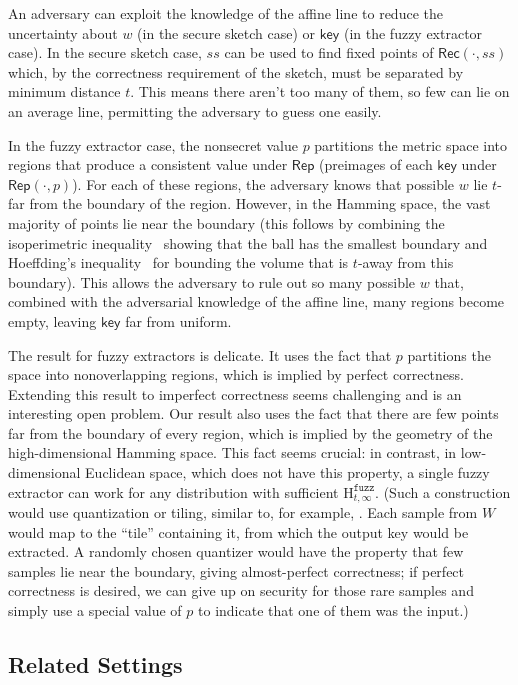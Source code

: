 \documentclass[11pt]{article}
\newcommand{\class}[1]{{\ensuremath{\mathsf{#1}}}}
\newcommand{\key}{\ensuremath{\class{key}}\xspace}
\newcommand{\rep}{\ensuremath{\class{Rep}}\xspace}
\newcommand{\rec}{\ensuremath{\class{Rec}}\xspace}
\newcommand{\Hfuzz}{\mathrm{H}^{\mathtt{fuzz}}_{t,\infty}}
\begin{document}
An adversary can exploit the knowledge of the affine line to reduce the uncertainty about $w$ (in the secure sketch case) or $\key$ (in the fuzzy extractor case). 
In the secure sketch case, $ss$ can be used to find fixed points of $\rec(\cdot, ss)$ which, by the correctness requirement of the sketch, must be separated by minimum distance $t$. This means there aren't too many of them, so few can lie on an average line, permitting the adversary to guess one easily.

In the fuzzy extractor case, the nonsecret value $p$ partitions the metric space into regions that produce a consistent value under $\rep$ (preimages of each $\key$ under $\rep(\cdot, p)$).  For each of these regions, the adversary knows that possible $w$ lie $t$-far from the boundary of the region.  However, in the Hamming space, the vast majority of points lie near the boundary (this follows by combining the isoperimetric inequality~\cite{harper1966optimal} showing that the ball has the smallest boundary and Hoeffding's inequality~\cite{hoeffding1963probability} for bounding the volume that is $t$-away from this boundary).  This allows the adversary to rule out so many possible $w$ that, combined with the adversarial knowledge of the affine line, many regions become empty, leaving $\key$ far from uniform.

The result for fuzzy extractors is delicate.  It uses the fact that $p$ partitions the space into nonoverlapping regions, which is implied by perfect correctness.  Extending this result to imperfect correctness seems challenging and is an interesting open problem. Our result also uses the fact that there are few points far from the boundary of every region, which is implied by the geometry of  the high-dimensional Hamming space.  This fact seems crucial: in contrast, in low-dimensional Euclidean space, which does not have this property, a single fuzzy extractor can work for any distribution with sufficient $\Hfuzz$. (Such a construction would use quantization or tiling, similar to, for example, \cite{CK03,LT03,CZC04,LC06,BDHTV10,VTOSS10}.  Each sample from $W$ would map to the ``tile'' containing it, from which the output key would be extracted. A randomly chosen quantizer would have the property that few samples lie near the boundary, giving almost-perfect correctness; if perfect correctness is desired, we can give up on security for those rare samples and simply use a special value of $p$ to indicate that one of them was the input.)

\subsection{Related Settings}
\label{sec:related settings}
\end{document}

